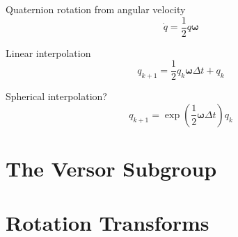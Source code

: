 \documentclass{amsart}
\theoremstyle{definition}
\theoremstyle{remark}
\numberwithin{equation}{section}
\begin{document}
Quaternion rotation from angular velocity
\begin{equation}
  \dot{q} = \frac{1}{2} q\boldsymbol\omega
\end{equation}

Linear interpolation
\begin{equation}
  q_{k+1} = \frac{1}{2}q_k\boldsymbol\omega\Delta t + q_k 
\end{equation}

Spherical interpolation?
\begin{equation}
  q_{k+1} = \exp\left(\frac{1}{2} \boldsymbol\omega\Delta t\right)q_k
\end{equation}



  



\section{The Versor Subgroup}



\section{Rotation Transforms}

%
\end{document}
